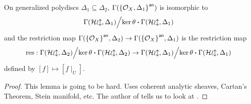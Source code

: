 \begin{lemma}
	On generalized polydiscs $\Delta_{1} \subseteq \Delta_{2}$, $\Gamma({\left\{{\mathcal{O}_{X}, \Delta_{1}}\right\}}^{\mathsf{an}})$ is isomorphic to \[{\Gamma(\mathcal{Hol}, \Delta_{1})}\Big/{\ker\theta\boldsymbol{\cdot}\Gamma(\mathcal{Hol}, \Delta_{1})}\] and the restriction map $\Gamma({\left\{{\mathcal{O}_{X}}\right\}}^{\mathsf{an}}, \Delta_{2}) \to \Gamma({\left\{{\mathcal{O}_{X}}\right\}}^{\mathsf{an}}, \Delta_{1})$ is the restriction map
	\[
		\mathrm{res} :
		{\Gamma(\mathcal{Hol}, \Delta_{2})}\Big/{\ker\theta\boldsymbol{\cdot}\Gamma(\mathcal{Hol}, \Delta_{2})} \to
		{\Gamma(\mathcal{Hol}, \Delta_{1})}\Big/{\ker\theta\boldsymbol{\cdot}\Gamma(\mathcal{Hol}, \Delta_{1})}
	\]
	defined by $[f] \mapsto [f\mid_{U}]$.
\end{lemma}
\begin{proof}
	This lemma is going to be hard. Uses coherent analytic sheaves, Cartan's Theorem, Stein manifold, etc. The author of \cite[page 108]{neeman2007algebraic} tells us to look at \cite[page 136, definition 2; page 243, theorem 2]{gunning2022analytic}.
\end{proof}


